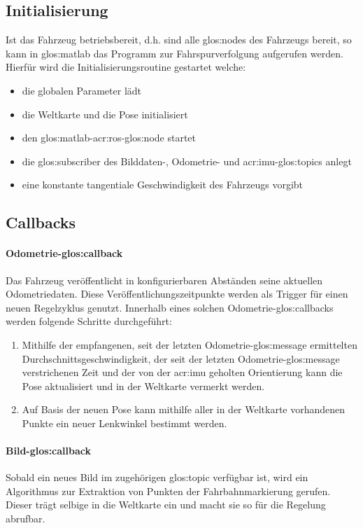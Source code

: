 \subsection{Initialisierung}
Ist das Fahrzeug betriebsbereit, d.h. sind alle \glspl{glos:node} des Fahrzeugs bereit, so kann in \gls{glos:matlab} das Programm zur Fahrspurverfolgung aufgerufen werden. Hierfür wird die Initialisierungsroutine gestartet welche:
\begin{itemize}
\item die globalen Parameter lädt
\item die Weltkarte und die Pose initialisiert
\item den \gls{glos:matlab}-\gls{acr:ros}-\gls{glos:node} startet
\item die \gls{glos:subscriber} des Bilddaten-, Odometrie- und \gls{acr:imu}-\glspl{glos:topic} anlegt
\item eine konstante tangentiale Geschwindigkeit des Fahrzeugs vorgibt 
\end{itemize}

\subsection{Callbacks}
\paragraph{Odometrie-\gls{glos:callback}}
Das Fahrzeug veröffentlicht in konfigurierbaren Abständen seine aktuellen Odometriedaten. Diese Veröffentlichungszeitpunkte werden als Trigger für einen neuen Regelzyklus genutzt. Innerhalb eines solchen Odometrie-\gls{glos:callback}s werden folgende Schritte durchgeführt:
\begin{enumerate}
\item Mithilfe der empfangenen, seit der letzten Odometrie-\gls{glos:message} ermittelten Durchschnittsgeschwindigkeit, der seit der letzten Odometrie-\gls{glos:message} verstrichenen Zeit und der von der \gls{acr:imu} geholten Orientierung kann die Pose aktualisiert und in der Weltkarte vermerkt werden.
\item Auf Basis der neuen Pose kann mithilfe aller in der Weltkarte vorhandenen Punkte ein neuer Lenkwinkel bestimmt werden.
\end{enumerate}
\paragraph{Bild-\gls{glos:callback}}
Sobald ein neues Bild im zugehörigen \gls{glos:topic} verfügbar ist, wird ein  Algorithmus zur Extraktion von Punkten der Fahrbahnmarkierung gerufen. Dieser trägt selbige in die Weltkarte ein und macht sie so für die Regelung abrufbar.
